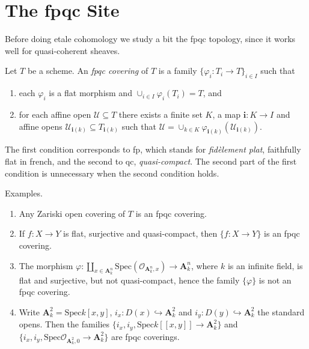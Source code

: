 \section{The fpqc Site}
\label{section-fpqc}

\noindent
Before doing etale cohomology we study a bit the fpqc topology, since
it works well for quasi-coherent sheaves.

\begin{definition}
\label{definition-fpqc-covering}
Let $T$ be a scheme. An {\it fpqc covering} of $T$ is a family
$\{ \varphi_i : T_i \to T\}_{i \in I}$ such that
\begin{enumerate}
\item each $\varphi_i$ is a flat morphism and
$\cup_{i\in I} \varphi_i (T_i) = T$, and
\item for each affine open $\mathcal{U} \subseteq T$ there exists a finite
set $K$, a map $\mathbf{i} : K \to I$ and affine opens
$\mathcal{U}_{\mathbf{i}(k)} \subseteq T_{\mathbf{i}(k)}$ such that
$\mathcal{U} =
\cup_{k \in K} \varphi_{\mathbf{i}(k)}(\mathcal{U}_{\mathbf{i}(k)})$.
\end{enumerate}
\end{definition}

\begin{remark}
\label{remark-fpqc}
The first condition corresponds to fp, which stands for {\it fid\`element 
plat}, faithfully flat in french, and the second to qc, {\it quasi-compact}. 
The second part of the first condition is unnecessary when the second condition 
holds.
\end{remark}

\begin{example}
\label{example-fpqc-coverings}
Examples.
\begin{enumerate}
\item Any Zariski open covering of $T$ is an fpqc covering.
\item If $f: X \to Y$ is flat, surjective and quasi-compact, then $\{ f: X\to 
Y\}$ is an fpqc covering.
\item The morphism $\varphi: \coprod_{x \in \mathbf{A}^n_k} \text{Spec} 
(\mathcal{O}_{\mathbf{A}^n_k,x}) \to \mathbf{A}^n_k $, where $k$ is an infinite 
field, is flat and surjective, but not quasi-compact, hence the family $\{ 
\varphi \}$ is not an fpqc covering.
\item Write $\mathbf{A}^2_k = \text{Spec} k[x,y]$, $i_x : D(x) \hookrightarrow 
\mathbf{A}^2_k$ and $i_y : D(y) \hookrightarrow \mathbf{A}^2_k$ the standard 
opens. Then the families $\{i_x, i_y, \text{Spec} k[[ x,y ]] \to \mathbf{A}^2_k 
\}$ and $\{i_x, i_y, \text{Spec} \mathcal{O}_{\mathbf{A}^2_k,0} \to 
\mathbf{A}^2_k \}$ are fpqc coverings.
\end{enumerate}
\end{example}

